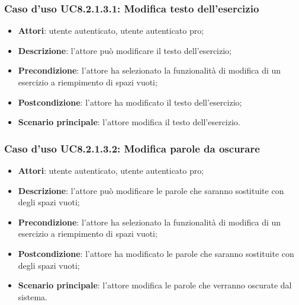 \subsubsection{Caso d'uso UC8.2.1.3.1: Modifica testo dell'esercizio}
	\begin{itemize}
		\item
			\textbf{Attori}: utente autenticato, utente autenticato pro;
		\item		
			\textbf{Descrizione}: l'attore può modificare il testo dell'esercizio;
		\item
			\textbf{Precondizione}: l'attore ha selezionato la funzionalità di modifica di un esercizio a riempimento di spazi vuoti; 
		\item
			\textbf{Postcondizione}: l'attore ha modificato il testo dell'esercizio;
		\item
			\textbf{Scenario principale}: l'attore modifica il testo dell'esercizio.
	\end{itemize}


\subsubsection{Caso d'uso UC8.2.1.3.2: Modifica parole da oscurare}
	\begin{itemize}
		\item
			\textbf{Attori}: utente autenticato, utente autenticato pro;
		\item		
			\textbf{Descrizione}: l'attore può modificare le parole che saranno sostituite con degli spazi vuoti;
		\item
			\textbf{Precondizione}: l'attore ha selezionato la funzionalità di modifica di un esercizio a riempimento di spazi vuoti; 
		\item
			\textbf{Postcondizione}: l'attore ha modificato le parole che saranno sostituite con degli spazi vuoti;
		\item
			\textbf{Scenario principale}: l'attore modifica le parole che verranno oscurate dal sistema.
	\end{itemize}
